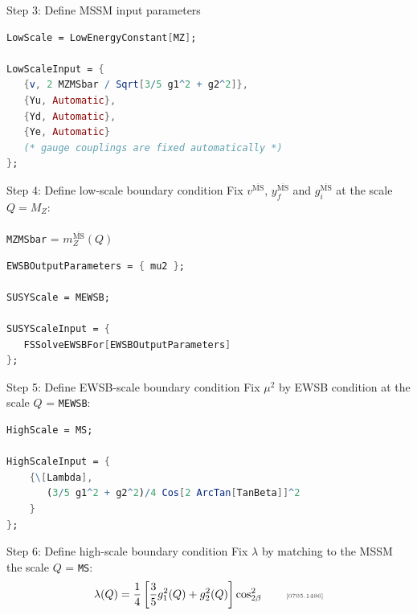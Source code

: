 \documentclass[hyperref={pdfpagelabels=false},ngerman]{beamer}
\newcommand{\mycite}[1]{\ensuremath{\text{\textcolor{darkgray}{\tiny [#1]}}}}
\newcommand{\MSbar}{\ensuremath{\overline{\text{MS}}}}
\begin{document}
\begin{frame}{Step 3: Define MSSM input parameters}
  \usebox{\listbox}
\end{frame}

\begin{lrbox}{\listbox}\begin{lstlisting}[language=Mathematica]
LowScale = LowEnergyConstant[MZ];

LowScaleInput = {
   {v, 2 MZMSbar / Sqrt[3/5 g1^2 + g2^2]},
   {Yu, Automatic},
   {Yd, Automatic},
   {Ye, Automatic}
   (* gauge couplings are fixed automatically *)
};
\end{lstlisting}\end{lrbox}

\begin{frame}{Step 4: Define low-scale boundary condition}
  Fix $v^{\MSbar}$, $y_f^{\MSbar}$ and $g_i^{\MSbar}$ at the scale $Q = M_Z$:\\[2em]
  \usebox{\listbox}
  \\[1em]
  \lstinline{MZMSbar} = $m_Z^{\MSbar}(Q)$
\end{frame}

\begin{lrbox}{\listbox}\begin{lstlisting}[language=Mathematica]
EWSBOutputParameters = { mu2 };

SUSYScale = MEWSB;

SUSYScaleInput = {
   FSSolveEWSBFor[EWSBOutputParameters]
};
\end{lstlisting}\end{lrbox}

\begin{frame}{Step 5: Define EWSB-scale boundary condition}
  Fix $\mu^2$ by EWSB condition at the scale $Q$ = \lstinline{MEWSB}:\\[2em]
  \usebox{\listbox}
\end{frame}

\begin{lrbox}{\listbox}\begin{lstlisting}[language=Mathematica]
HighScale = MS;

HighScaleInput = {
    {\[Lambda],
       (3/5 g1^2 + g2^2)/4 Cos[2 ArcTan[TanBeta]]^2
    }
};
\end{lstlisting}\end{lrbox}

\begin{frame}{Step 6: Define high-scale boundary condition}
  Fix $\lambda$ by matching to the MSSM the scale $Q$ = \lstinline{MS}:
  \begin{align*}
    \lambda(Q) = \frac{1}{4} \left[ \frac{3}{5} g_1^2(Q) + g_2^2(Q) \right] \cos_{2\beta}^2
    \qquad \text{\mycite{0705.1496}}
  \end{align*}
  \\[1em]
  \usebox{\listbox}
\end{frame}
\end{document}
